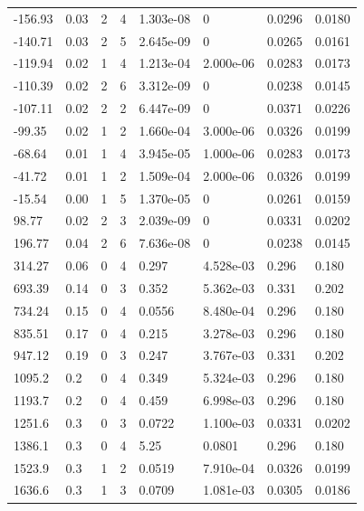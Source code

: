 \documentclass[preview]{standalone}
\begin{document}
{{\begin{tabular}{L{1.2cm}C{1.2cm} C{0.3cm}C{0.5cm} C{1.4cm}C{1.4cm} C{1.4cm}C{1.4cm}}
  -156.93  &  0.03  & 2     &  4 &  1.303e-08  & 0  & 0.0296 &  0.0180   \\ 
  -140.71  &  0.03  & 2     &  5 &  2.645e-09  & 0  & 0.0265 &  0.0161   \\ 
  -119.94  &  0.02  & 1     &  4 &  1.213e-04  & 2.000e-06  & 0.0283 &  0.0173   \\ 
  -110.39  &  0.02  & 2     &  6 &  3.312e-09  & 0  & 0.0238 &  0.0145   \\ 
  -107.11  &  0.02  & 2     &  2 &  6.447e-09  & 0  & 0.0371 &  0.0226   \\ 
  -99.35  &  0.02  & 1     &  2 &  1.660e-04  & 3.000e-06  & 0.0326 &  0.0199   \\ 
  -68.64  &  0.01  & 1     &  4 &  3.945e-05  & 1.000e-06  & 0.0283 &  0.0173   \\ 
  -41.72  &  0.01  & 1     &  2 &  1.509e-04  & 2.000e-06  & 0.0326 &  0.0199   \\ 
  -15.54  &  0.00  & 1     &  5 &  1.370e-05  & 0  & 0.0261 &  0.0159   \\ 
  98.77  &  0.02  & 2     &  3 &  2.039e-09  & 0  & 0.0331 &  0.0202   \\ 
  196.77  &  0.04  & 2     &  6 &  7.636e-08  & 0  & 0.0238 &  0.0145   \\ 
  314.27  &  0.06  & 0     &  4 &  0.297  & 4.528e-03  & 0.296 &  0.180   \\ 
  693.39  &  0.14  & 0     &  3 &  0.352  & 5.362e-03  & 0.331 &  0.202   \\ 
  734.24  &  0.15  & 0     &  4 &  0.0556  & 8.480e-04  & 0.296 &  0.180   \\ 
  835.51  &  0.17  & 0     &  4 &  0.215  & 3.278e-03  & 0.296 &  0.180   \\ 
  947.12  &  0.19  & 0     &  3 &  0.247  & 3.767e-03  & 0.331 &  0.202   \\ 
  1095.2  &   0.2  & 0     &  4 &  0.349  & 5.324e-03  & 0.296 &  0.180   \\ 
  1193.7  &   0.2  & 0     &  4 &  0.459  & 6.998e-03  & 0.296 &  0.180   \\ 
  1251.6  &   0.3  & 0     &  3 &  0.0722  & 1.100e-03  & 0.0331 &  0.0202   \\ 
  1386.1  &   0.3  & 0     &  4 &  5.25  & 0.0801  & 0.296 &  0.180   \\ 
  1523.9  &   0.3  & 1     &  2 &  0.0519  & 7.910e-04  & 0.0326 &  0.0199   \\ 
  1636.6  &   0.3  & 1     &  3 &  0.0709  & 1.081e-03  & 0.0305 &  0.0186   \\ 

\end{tabular}}}
\end{document}
